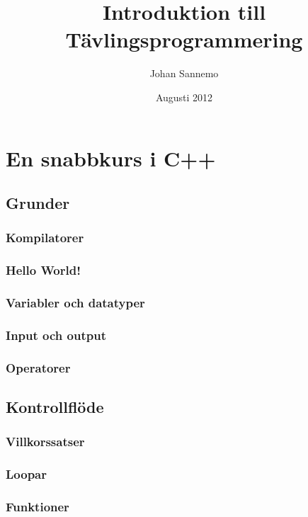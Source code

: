 \documentclass[10pt,a4paper]{report}
\author{Johan Sannemo}
\title{Introduktion till Tävlingsprogrammering}
\date{Augusti 2012}
\begin{document}
\maketitle
\tableofcontents



\chapter{En snabbkurs i C++}

\section{Grunder}
	
\subsection{Kompilatorer}

\subsection{Hello World!}

\subsection{Variabler och datatyper}

\subsection{Input och output}

\subsection{Operatorer}


\section{Kontrollflöde}
\subsection{Villkorssatser}

\subsection{Loopar}

\subsection{Funktioner}

\end{document}
